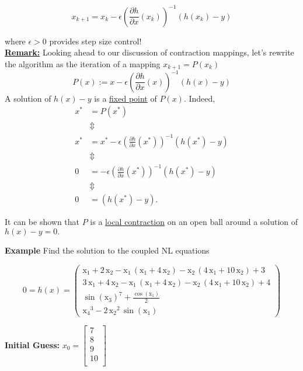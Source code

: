 \documentclass[letterpaper]{article}
\newcommand{\pardiff}[2][]{\frac{\partial#1}{\partial#2}}
\begin{document}
\begin{enumerate}
$$\boxed{x_{k+1} = x_k-\epsilon\left(\pardiff[h]{x}(x_k)\right)^{-1}(h(x_k)-y)}$$

where $\epsilon>0$ provides step size control!\\

\textbf{\underline{Remark:}} Looking ahead to our discussion of contraction mappings, let's rewrite the algorithm as the iteration of a mapping $x_{k+1} =P(x_k)$
$$\boxed{P(x):= x-\epsilon\left(\pardiff[h]{x}(x)\right)^{-1}(h(x)-y)}$$
A solution of $h(x)-y$ is a \underline{fixed point} of $P(x)$.
Indeed,
\begin{align*}
x^* & = P(x^*) \\
&\Updownarrow \\
x^*&=x^*-\epsilon\left(\pardiff[h]{x}(x^*)\right)^{-1}(h(x^*)-y)\\
&\Updownarrow \\
0&=-\epsilon\left(\pardiff[h]{x}(x^*)\right)^{-1}(h(x^*)-y)\\
&\Updownarrow \\
0&=(h(x^*)-y).
\end{align*}

It can be shown that $P$ is a \underline{local contraction} on an open ball around a solution of $h(x)-y=0.$

\newpage

\noindent \textbf{Example} Find the solution to the coupled NL equations

$$0 = h(x)=
\left(\begin{array}{c} \mathrm{x_1} + 2\, \mathrm{x_2} - \mathrm{x_1}\, \left(\mathrm{x_1} + 4\, \mathrm{x_2}\right) - \mathrm{x_2}\, \left(4\, \mathrm{x_1} + 10\, \mathrm{x_2}\right) + 3\\ 3\, \mathrm{x_1} + 4\, \mathrm{x_2} - \mathrm{x_1}\, \left(\mathrm{x_1} + 4\, \mathrm{x_2}\right) - \mathrm{x_2}\, \left(4\, \mathrm{x_1} + 10\, \mathrm{x_2}\right) + 4\\ {\sin\!\left(\mathrm{x_3}\right)}^7 + \frac{\cos\!\left(\mathrm{x_1}\right)}{2}\\ {\mathrm{x_4}}^3 - 2\, {\mathrm{x_2}}^2\, \sin\!\left(\mathrm{x_1}\right) \end{array}\right)
$$
\vspace*{1cm}

\textbf{Initial Guess:} $x_0 = \begin{bmatrix}  7\\
     8\\
     9\\
    10\\
    \end{bmatrix} $



\end{enumerate}
\end{document}
